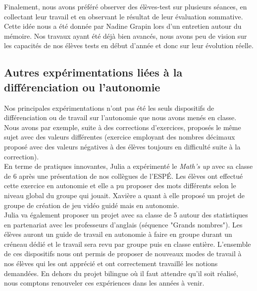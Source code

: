 Finalement, nous avons préféré observer des élèves-test sur plusieurs séances, en collectant leur travail et en observant le résultat de leur évaluation sommative. Cette idée nous a été donnée par Nadine Grapin lors d'un entretien autour du mémoire. Nos travaux ayant été déjà bien avancés, nous avons peu de vision sur les capacités de nos élèves tests en début d'année et donc sur leur évolution réelle.

\subsection{Autres expérimentations liées à la différenciation ou l’autonomie}
Nos principales expérimentations n'ont pas été les seuls dispositifs de différenciation ou de travail sur l'autonomie que nous avons menés en classe. Nous avons par exemple, suite à des corrections d'exercices, proposés le même sujet avec des valeurs différentes (exercice employant des nombres décimaux proposé avec des valeurs négatives à des élèves toujours en difficulté suite à la correction).\\
En terme de pratiques innovantes, Julia a expérimenté le \textit{Math's up}\cite{maths_up} avec sa classe de 6 après une présentation de nos collègues de l'ESPÉ. Les élèves ont effectué cette exercice en autonomie et elle a pu proposer des mots différents selon le niveau global du groupe qui jouait. Xavière a quant à elle proposé un projet de groupe de création de jeu vidéo guidé mais en autonomie.\\
Julia va également proposer un projet avec sa classe de 5 autour des statistiques en partenariat avec les professeurs d'anglais (séquence "Grands nombres"). Les élèves auront un guide de travail en autonomie à faire en groupe durant un créneau dédié et le travail sera revu par groupe puis en classe entière.
L'ensemble de ces dispositifs nous ont permis de proposer de nouveaux modes de travail à nos élèves qui les ont apprécié et ont correctement travaillé les notions demandées. En dehors du projet bilingue où il faut attendre qu'il soit réalisé, nous comptons renouveler ces expériences dans les années à venir.
